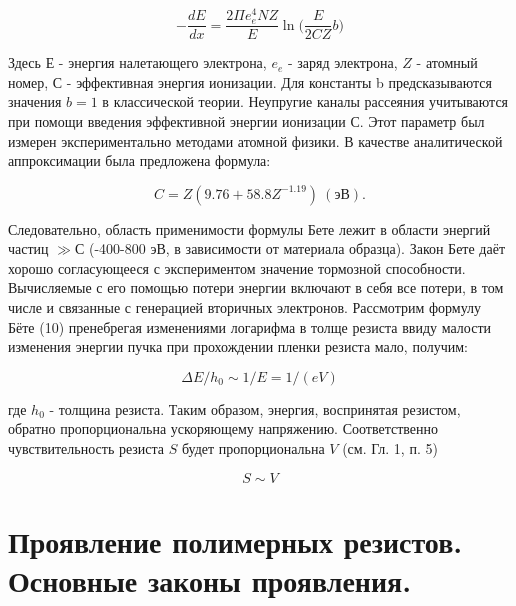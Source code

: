 \begin{equation}
-\frac{dE}{dx}=\frac{2\Pi e_e^4 NZ}{E} \ln {(}\frac{E}{2CZ}b{)}
\label{eq:A10}
\end{equation}

Здесь $Е$ - энергия налетающего электрона, $e_e$ - заряд электрона, $Z$ - атомный номер, $С$ - эффективная энергия ионизации. Для константы b предсказываются значения $b = 1$ в классической теории. Неупругие каналы рассеяния учитываются при помощи введения эффективной энергии ионизации С. Этот параметр был измерен экспериментально методами атомной физики. В качестве аналитической аппроксимации была предложена формула:

\begin{equation}
C=Z\left(9.76+58.8Z^{-1.19}\right)~(\text{эВ}).
\label{eq:A11}
\end{equation}

Следовательно, область применимости формулы Бете лежит в области энергий частиц $\gg С$  (-400-800 эВ, в зависимости от материала образца). Закон Бете даёт хорошо согласующееся с экспериментом значение тормозной способности. Вычисляемые с его помощью потери энергии включают в себя все потери, в том числе и связанные с генерацией вторичных электронов.
Рассмотрим формулу Бёте (10) пренебрегая изменениями логарифма в толще резиста ввиду малости изменения энергии пучка при прохождении пленки резиста мало, получим:

\begin{equation}
\Delta E/h_0 \sim 1/E= 1/(eV)
\end{equation}

где $h_0$ - толщина резиста. Таким образом, энергия, воспринятая резистом, обратно пропорциональна ускоряющему напряжению. Соответственно чувствительность резиста $S$ будет пропорциональна $V$ (см. Гл. 1, п. 5)

\begin{equation}
S \sim V
\end{equation}

\section{Проявление полимерных резистов. Основные законы проявления.}

